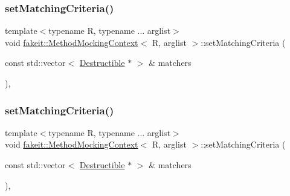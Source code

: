 \mbox{\label{classfakeit_1_1MethodMockingContext_affc5ac50fc419a5f8b5adff8d5d02941}} 
\subsubsection{\texorpdfstring{setMatchingCriteria()}{setMatchingCriteria()}\hspace{0.1cm}{\footnotesize\ttfamily [17/27]}}
{\footnotesize\ttfamily template$<$typename R, typename ... arglist$>$ \\
void \mbox{\hyperlink{classfakeit_1_1MethodMockingContext}{fakeit\+::\+Method\+Mocking\+Context}}$<$ R, arglist $>$\+::set\+Matching\+Criteria (\begin{DoxyParamCaption}\item[{const std\+::vector$<$ \mbox{\hyperlink{classfakeit_1_1Destructible}{Destructible}} $\ast$ $>$ \&}]{matchers }\end{DoxyParamCaption})\hspace{0.3cm}{\ttfamily [inline]}, {\ttfamily [protected]}}

\mbox{\label{classfakeit_1_1MethodMockingContext_affc5ac50fc419a5f8b5adff8d5d02941}} 
\subsubsection{\texorpdfstring{setMatchingCriteria()}{setMatchingCriteria()}\hspace{0.1cm}{\footnotesize\ttfamily [18/27]}}
{\footnotesize\ttfamily template$<$typename R, typename ... arglist$>$ \\
void \mbox{\hyperlink{classfakeit_1_1MethodMockingContext}{fakeit\+::\+Method\+Mocking\+Context}}$<$ R, arglist $>$\+::set\+Matching\+Criteria (\begin{DoxyParamCaption}\item[{const std\+::vector$<$ \mbox{\hyperlink{classfakeit_1_1Destructible}{Destructible}} $\ast$ $>$ \&}]{matchers }\end{DoxyParamCaption})\hspace{0.3cm}{\ttfamily [inline]}, {\ttfamily [protected]}}


